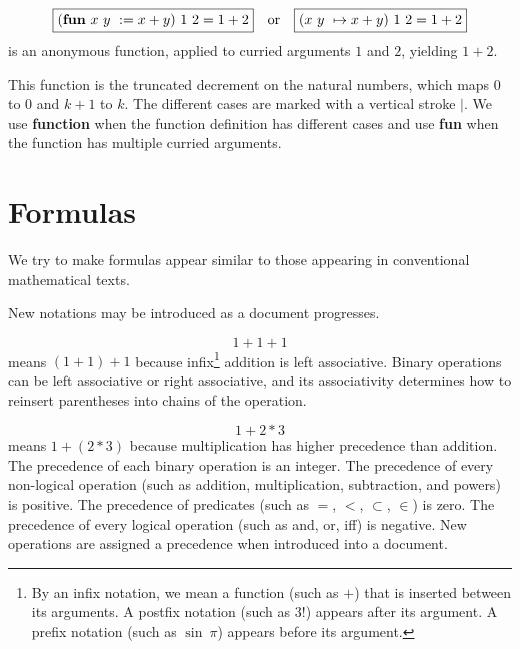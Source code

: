 \documentclass[12pt]{article}
\numberwithin{definition}{section}
\begin{document}
\[
\boxed{(\text{\bf fun}\ x\ y\ := x + y)\ 1\ 2 = 1+2}\quad\text{or}\quad
\boxed{(x\ y\ \mapsto x+y)\ 1\ 2 = 1+2}
\]
is an anonymous 
function, applied to curried arguments $1$ and $2$, yielding $1+2$.



\begin{center}
\end{center}
This function is the truncated decrement on the natural numbers, which maps $0$ to $0$
and $k+1$ to $k$.   The different cases are marked with a vertical stroke $|$.
We use {\bf function} when the function definition has different cases
and use {\bf fun} when the function has multiple curried arguments.


\section{Formulas}

We try to make formulas appear similar to those appearing
in conventional mathematical texts.

New notations may be introduced as a document progresses.

\[
\boxed{1 + 1 + 1}
\]
means $(1+1)+1$ because infix\footnote{By an infix notation,
we mean a function (such as $+$) that is inserted between its
arguments.  A postfix notation (such as $3!$) appears after
its argument. A prefix notation (such as $\sin\ \pi$) appears before
its argument.} addition is left associative.  Binary
operations can be left associative or right associative, and its
associativity determines how to reinsert parentheses into chains of
the operation.

\[
\boxed{1 + 2 * 3}
\]
means $1 + (2*3)$ because 
multiplication has higher precedence than
addition.  The precedence of each binary operation is an integer.  The
precedence of every non-logical operation (such as addition,
multiplication, subtraction, and powers) is positive. The precedence
of predicates (such as $=$, $<$, $\subset$, $\in$) is zero. The
precedence of every logical operation (such as and, or, iff) is
negative.  New operations are assigned a precedence when introduced
into a document.
\end{document}
